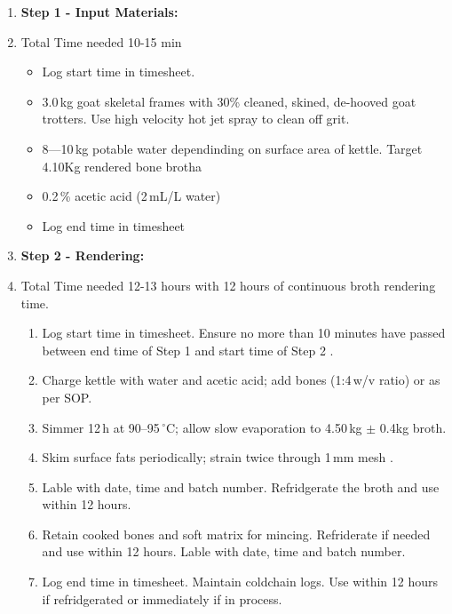 \begin{enumerate}
  \item \textbf{Step 1 - Input Materials:}
    \item Total Time needed 10-15 min 
    \begin{itemize}
     \item  Log start time in timesheet. 
      \item 3.0\,kg goat skeletal frames with 30\% cleaned, skined, de-hooved goat trotters. Use high velocity hot jet spray to clean off grit. 
      \item 8---10\,kg potable water dependinding on surface area of kettle. Target 4.10Kg rendered bone brotha
      \item 0.2\,\% acetic acid (2\,mL/L water)
      \item Log end time in timesheet
    \end{itemize}

  \item \textbf{Step 2 - Rendering:}
  \item Total Time needed 12-13 hours with 12 hours of continuous broth rendering time.
    \begin{enumerate}
      \item Log start time in timesheet. Ensure no more than 10 minutes have passed between end time of Step 1 and start time of Step 2 .
      \item Charge kettle with water and acetic acid; add bones (1:4\,w/v ratio) or as per SOP.
      \item Simmer 12\,h at 90–95\,$^{\circ}$C; allow slow evaporation to 4.50\,kg $\pm$ 0.4kg broth.
      \item Skim surface fats periodically; strain  twice through 1\,mm mesh . 
      \item Lable with date, time and batch number. Refridgerate the broth and use within 12 hours. 
      \item Retain cooked bones and soft matrix for mincing. Refriderate if needed and use within 12 hours. Lable with date, time and batch number.
      \item Log end time in timesheet. Maintain coldchain  logs. Use within 12 hours if refridgerated or immediately if in process.
    \end{enumerate}


\end{enumerate}
